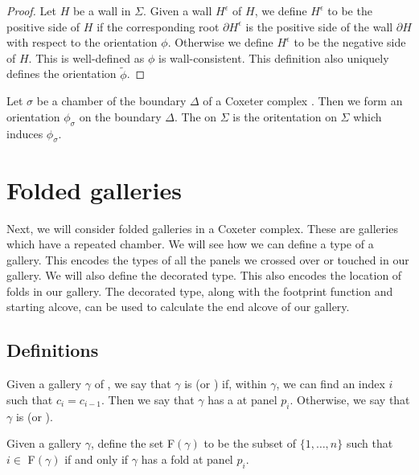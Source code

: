 \documentclass[11pt]{article}
\begin{document}
\begin{proof}
    Let $H$ be a wall in $\Sigma$. Given a wall $H^\epsilon$ of $H$, we define $H^\epsilon$ to be the positive side of $H$ if the corresponding root $\partial H^\epsilon$ is the positive side of the wall $\partial H$ with respect to the orientation $\phi$. Otherwise we define $H^\epsilon$ to be the negative side of $H$. This is well-defined as $\phi$ is wall-consistent. This definition also uniquely defines the orientation $\tilde{\phi}$. 
\end{proof}

\begin{definition}
    Let $\sigma$ be a chamber of the boundary $\Delta$ of a Coxeter complex \sg. Then we form an orientation $\phi_{\sigma}$ on the boundary $\Delta$. The  on $\Sigma$ is the oritentation on $\Sigma$ which induces $\phi_{\sigma}$. 
\end{definition}


\section{Folded galleries}\label{7}

Next, we will consider folded galleries in a Coxeter complex. These are galleries which have a repeated chamber. We will see how we can define a type of a gallery. This encodes the types of all the panels we crossed over or touched in our gallery. We will also define the decorated type. This also encodes the location of folds in our gallery. The decorated type, along with the footprint function and starting alcove, can be used to calculate the end alcove of our gallery. 

\subsection{Definitions}


\begin{definition}
    Given a gallery $\gamma$ of \sg, we say that $\gamma$ is  (or ) if, within $\gamma$, we can find an index $i$ such that $c_i=c_{i-1}$. Then we say that $\gamma$ has a  at panel $p_i$. Otherwise, we say that $\gamma$ is  (or ).  
\end{definition}

\begin{definition}
    Given a gallery $\gamma$, define the set F$(\gamma)$ to be the subset of $\{1,\hdots ,n\}$ such that $i\in$ F$(\gamma)$ if and only if $\gamma$ has a fold at panel $p_i$. 
\end{definition}
\end{document}
